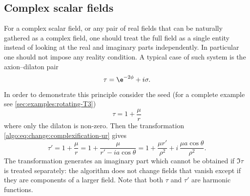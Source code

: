 \subsection{Complex scalar fields}


For a complex scalar field, or any pair of real fields that can be naturally gathered as a complex field, one should treat the full field as a single entity instead of looking at the real and imaginary parts independently.
In particular one should not impose any reality condition.
A typical case of such system is the axion--dilaton pair
\begin{equation}
	\tau = \e^{-2\phi} + i \sigma.
\end{equation} 

In order to demonstrate this principle consider the seed (for a complete example see \cref{sec:examples:rotating-T3})
\begin{equation}
	\tau = 1 + \frac{\mu}{r}
\end{equation} 
where only the dilaton is non-zero.
Then the transformation \eqref{algo:eq:change:complexification-ur} gives
\begin{equation}
	\tau' = 1 + \frac{\mu}{r}
		= 1 + \frac{\mu}{r' - i a \cos\theta}
		= 1 + \frac{\mu r'}{\rho^2} + i\, \frac{\mu a \cos\theta}{\rho^2}.
\end{equation} 
The transformation generates an imaginary part which cannot be obtained if $\Im \tau$ is treated separately: the algorithm does not change fields that vanish except if they are components of a larger field.
Note that both $\tau$ and $\tau'$ are harmonic functions.
